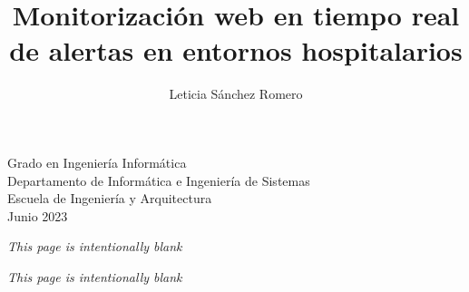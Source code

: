 \documentclass[a4paper,12pt,twoside,hidelinks,openright]{report}
\begin{document}
\begin{titlepage}
\setcounter{footnote}{1}

\vspace*{16.45mm}
\fontsize{12pt}{12pt}\selectfont
\begin{center}
Grado en Ingeniería Informática\\
Departamento de Informática e Ingeniería de Sistemas\\
Escuela de Ingeniería y Arquitectura\\
\vspace*{3.56mm}
Junio 2023\\
\end{center}


\renewcommand{\thefootnote}{\arabic{footnote}}
\end{titlepage}
\newpage


\title{Monitorización web en tiempo real de alertas en entornos hospitalarios}
\author{Leticia Sánchez Romero}

\pagebreak
\thispagestyle{empty}
\vspace*{\fill}
\hspace*{\fill}
\textit{This page is intentionally blank}
\hspace*{\fill}
\vspace*{\fill}
\pagebreak

\baselineskip 19pt

\renewcommand{\labelitemi}{$-$}
\renewcommand{\tablename}{Tabla}

\renewcommand{\appendixname}{Anexos}
\renewcommand{\appendixtocname}{Anexos}
\renewcommand{\appendixpagename}{Anexos}




\thispagestyle{empty}
\vspace*{\fill}
\hspace*{\fill}
\textit{This page is intentionally blank}
\hspace*{\fill}
\vspace*{\fill}
\pagebreak

\setcounter{page}{1}
\newpage
\end{document}
